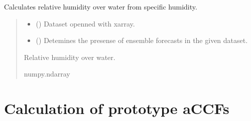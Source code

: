 \documentclass[a4paper,11pt,english]{sphinxmanual}
\begin{document}
\begin{fulllineitems}
\label{\detokenize{modules:climaccf.contrail.get_rw_from_specific_hum}}
\pysigstartsignatures
{}
\pysigstopsignatures
\sphinxAtStartPar
Calculates relative humidity over water from specific humidity.
\begin{quote}\begin{description}
\begin{itemize}
\item {} 
\sphinxAtStartPar
{} () \textendash{} Dataset openned with xarray.

\item {} 
\sphinxAtStartPar
{} () \textendash{} Detemines the presense of ensemble forecasts in the given dataset.

\end{itemize}

\sphinxAtStartPar
Relative humidity over water.

\sphinxAtStartPar
numpy.ndarray

\end{description}\end{quote}

\end{fulllineitems}



\section{Calculation of prototype aCCFs}
\label{\detokenize{modules:calculation-of-prototype-accfs}}
\end{document}
